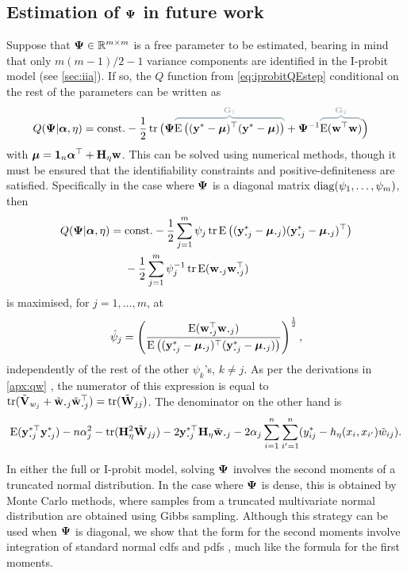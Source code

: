 \subsection{Estimation of \texorpdfstring{${\bm\Psi}$}{$\Psi$} in future work}
\label{sec:difficultPsi}

Suppose that ${\bm\Psi} \in \mathbb{R}^{m\times m}$ is a free parameter to be estimated, bearing in mind that only $m(m-1)/2 - 1$ variance components are identified in the I-probit model (see \cref{sec:iia}).
If so, the $Q$ function from \cref{eq:iprobitQEstep} conditional on the rest of the parameters can be written as
\vspace{-1.3em}
\begin{align*}
  Q(\bPsi|\balpha,\eta)
  &= \const 
  -\half \tr 
  \big( 
  \bPsi
  \greyoverbrace{\E\big( (\by^* - \bmu)^\top (\by^* - \bmu) \big)}{\bG_1}
  +
  \bPsi^{-1}
  \greyoverbrace{\E(\bw^\top\bw)}{\bG_2} 
  \Big)
\end{align*}
with ${\bm\mu} = {\mathbf 1}_n{\bm\alpha}^\top + {\mathbf H}_\eta{\mathbf w}$.
This can be solved using numerical methods, though it must be ensured that the identifiability constraints and positive-definiteness are satisfied.
Specifically in the case where ${\bm\Psi}$ is a diagonal matrix $\operatorname{diag}(\psi_1,\dots,\psi_m)$, then
\begin{align*}
  \vspace{-0.5em}
  Q(\bPsi|\balpha,\eta)
  ={}& \const -\half \sum_{j=1}^m \psi_j \tr
  \E\big( (\by^*_{\bigcdot j} - \bmu_{\bigcdot j})(\by^*_{\bigcdot j} - \bmu_{\bigcdot j})^\top \big) \\
  & -\half \sum_{j=1}^m \psi_j^{-1} \tr
  \E(\bw_{\bigcdot j}\bw_{\bigcdot j}^\top)
\end{align*}
is maximised, for $j=1,\dots,m$, at
\[
  \hat\psi_j = \left( 
  \frac{\E( \bw_{\bigcdot j}^\top\bw_{\bigcdot j} ) }{\E\big( (\by^*_{\bigcdot j} - \bmu_{\bigcdot j})^\top (\by^*_{\bigcdot j} - \bmu_{\bigcdot j}) \big) }
  \right)^{\half},
\] 
independently of the rest of the other $\psi_k$'s, $k\neq j$.
As per the derivations in \cref{apx:qw} , the numerator of this expression is equal to $\tr(\tilde\bV_{w_j} + \tilde\bw_{\bigcdot j}\tilde\bw_{\bigcdot j}^\top) = \tr (\tilde\bW_{jj})$.
The denominator on the other hand is
\[
  \E(\by_{\bigcdot j}^{*\top}\by_{\bigcdot j}^*) - 
  n\alpha_j^2 - \tr( \bH_\eta^2 \tilde\bW_{jj}) 
  - 2\by^{*\top}_{\bigcdot j}\bH_\eta\tilde\bw_{\bigcdot j}
  - 2\alpha_j \sum_{i=1}^n\sum_{i'=1}^n (y_{ij}^* - h_\eta(x_{i},x_{i'}) \tilde w_{ij}).
\]

In either the full or I-probit model, solving ${\bm\Psi}$ involves the second moments of a truncated normal distribution.
In the case where ${\bm\Psi}$ is dense, this is obtained by Monte Carlo methods, where samples from a truncated multivariate normal distribution are obtained using Gibbs sampling.
Although this strategy can be used when ${\bm\Psi}$ is diagonal, we show that the form for the second moments  involve integration of standard normal cdfs and pdfs , much like the formula for the first moments.
